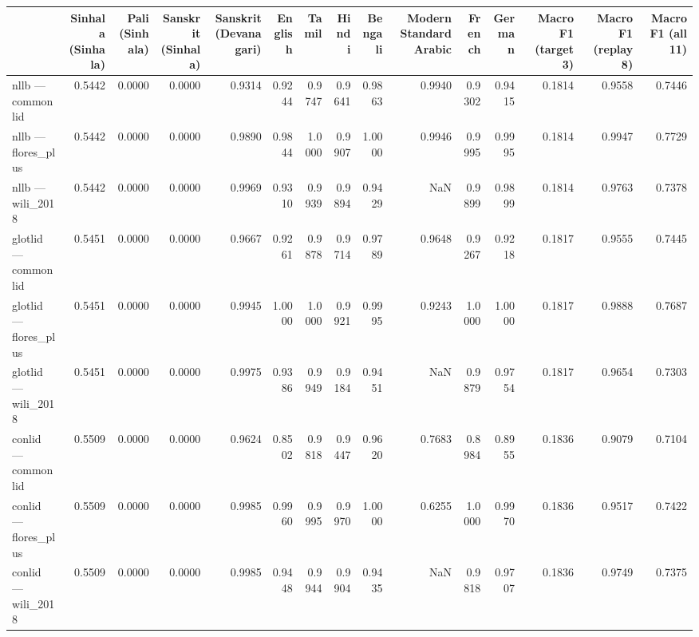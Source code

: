 \begin{tabular}{lrrrrrrrrrrrrrr}
\toprule
 & Sinhala (Sinhala) & Pali (Sinhala) & Sanskrit (Sinhala) & Sanskrit (Devanagari) & English & Tamil & Hindi & Bengali & Modern Standard Arabic & French & German & Macro F1 (target 3) & Macro F1 (replay 8) & Macro F1 (all 11) \\
\midrule
nllb — commonlid & 0.5442 & 0.0000 & 0.0000 & 0.9314 & 0.9244 & 0.9747 & 0.9641 & 0.9863 & 0.9940 & 0.9302 & 0.9415 & 0.1814 & 0.9558 & 0.7446 \\
nllb — flores\_plus & 0.5442 & 0.0000 & 0.0000 & 0.9890 & 0.9844 & 1.0000 & 0.9907 & 1.0000 & 0.9946 & 0.9995 & 0.9995 & 0.1814 & 0.9947 & 0.7729 \\
nllb — wili\_2018 & 0.5442 & 0.0000 & 0.0000 & 0.9969 & 0.9310 & 0.9939 & 0.9894 & 0.9429 & NaN & 0.9899 & 0.9899 & 0.1814 & 0.9763 & 0.7378 \\
glotlid — commonlid & 0.5451 & 0.0000 & 0.0000 & 0.9667 & 0.9261 & 0.9878 & 0.9714 & 0.9789 & 0.9648 & 0.9267 & 0.9218 & 0.1817 & 0.9555 & 0.7445 \\
glotlid — flores\_plus & 0.5451 & 0.0000 & 0.0000 & 0.9945 & 1.0000 & 1.0000 & 0.9921 & 0.9995 & 0.9243 & 1.0000 & 1.0000 & 0.1817 & 0.9888 & 0.7687 \\
glotlid — wili\_2018 & 0.5451 & 0.0000 & 0.0000 & 0.9975 & 0.9386 & 0.9949 & 0.9184 & 0.9451 & NaN & 0.9879 & 0.9754 & 0.1817 & 0.9654 & 0.7303 \\
conlid — commonlid & 0.5509 & 0.0000 & 0.0000 & 0.9624 & 0.8502 & 0.9818 & 0.9447 & 0.9620 & 0.7683 & 0.8984 & 0.8955 & 0.1836 & 0.9079 & 0.7104 \\
conlid — flores\_plus & 0.5509 & 0.0000 & 0.0000 & 0.9985 & 0.9960 & 0.9995 & 0.9970 & 1.0000 & 0.6255 & 1.0000 & 0.9970 & 0.1836 & 0.9517 & 0.7422 \\
conlid — wili\_2018 & 0.5509 & 0.0000 & 0.0000 & 0.9985 & 0.9448 & 0.9944 & 0.9904 & 0.9435 & NaN & 0.9818 & 0.9707 & 0.1836 & 0.9749 & 0.7375 \\
\bottomrule
\end{tabular}
